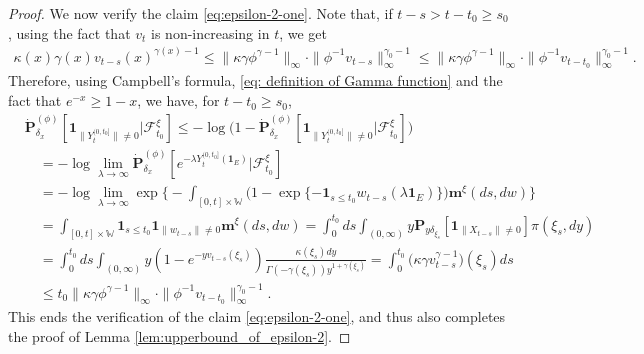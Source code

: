 \documentclass[12pt,a4paper]{amsart}
\theoremstyle{definition}
\numberwithin{equation}{section}
\begin{document}
\begin{proof}
We now verify the claim \eqref{eq:epsilon-2-one}.
Note that, if $t-s > t-t_0 \geq s_0$, using the fact that $v_t$ is non-increasing in $t$, we get
\begin{align}
	\kappa(x)\gamma(x) v_{t-s}(x)^{\gamma(x)-1}
	\leq \|\kappa \gamma \phi^{\gamma - 1}\|_\infty \cdot \|\phi^{-1} v_{t-s}\|^{\gamma_0-1}_\infty
	\leq \|\kappa\gamma\phi^{\gamma - 1}\|_\infty \cdot \|\phi^{-1}v_{t-t_0}\|^{\gamma_0-1}_\infty.
\end{align}
Therefore, using Campbell's formula, \eqref{eq: definition of Gamma function} and the fact that $e^{-x} \geq 1-x$, we have,  for $t-t_0 \geq s_0$,
\begin{align}
	&\dot{\mathbf P}_{\delta_x}^{(\phi)}[\mathbf 1_{\| Y_t^{(0,t_0]}\|\neq 0}|\mathscr F^\xi_{t_0}]
   \leq - \log \big( 1- \dot{\mathbf P}_{\delta_x}^{(\phi)}[\mathbf 1_{ \| Y_t^{(0,t_0]}\|\neq 0}|\mathscr F^\xi_{t_0}]\big)
	\\&\quad =  - \log \lim_{\lambda \to \infty}\dot{\mathbf P}_{\delta_x}^{(\phi)}[e^{- \lambda Y_t^{(0,t_0]}(\mathbf 1_E) }|\mathscr F^\xi_{t_0}]
	\\&\quad = -\log \lim_{\lambda \to \infty} \exp\Big\{- \int_{[0,t]\times \mathbb W} \big( 1-\exp\{- \mathbf 1_{s\leq t_0} w_{t-s}(\lambda \mathbf 1_E)\}  \big) \mathbf m^\xi(ds,dw)\Big\}
	\\&\quad = \int_{[0,t]\times \mathbb W}\mathbf 1_{s\leq t_0} \mathbf 1_{ \|w_{t-s}\| \neq 0} \mathbf m^\xi(ds,dw)
	= \int_0^{t_0} ds \int_{(0,\infty)} y\mathbf P_{y\delta_{\xi_s}}[\mathbf 1_{ \|X_{t-s}\| \neq 0}]\pi(\xi_s,dy)
	  \\&\quad= \int_0^{t_0} ds \int_{(0,\infty)} y (1-e^{-yv_{t-s}(\xi_s)})  \frac{\kappa(\xi_s)dy}{\Gamma(-\gamma(\xi_s)) y^{1+\gamma(\xi_s)}}
	= \int_0^{t_0} \big( \kappa \gamma  v_{t-s}^{\gamma - 1} \big) (\xi_s)ds
	\\&\quad \leq  t_0\|\kappa \gamma \phi^{\gamma - 1}\|_\infty \cdot \|\phi^{-1}v_{t-t_0}\|^{\gamma_0-1}_\infty.
\end{align}
This ends the verification of the claim \eqref{eq:epsilon-2-one}, and thus also completes the proof of Lemma \ref{lem:upperbound_of_epsilon-2}.
\end{proof}
\end{document}
